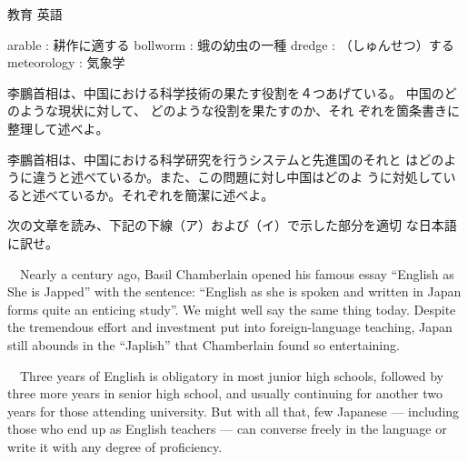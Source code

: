 \documentclass[fleqn]{jbook}
\begin{document}
\begin{question}{教育 英語}{}
\begin{subquestions}
  arable      : 耕作に適する \quad
  bollworm    : 蛾の幼虫の一種 \quad
  dredge      : （しゅんせつ）する \quad
  meteorology : 気象学
\baselineskip=15pt

  \noindent{[設問]}
  \begin{subsubquestions}
  \SubSubQuestion
    李鵬首相は、中国における科学技術の果たす役割を４つあげている。
  中国のどのような現状に対して、 どのような役割を果たすのか、それ
  ぞれを箇条書きに整理して述べよ。

  \SubSubQuestion
    李鵬首相は、中国における科学研究を行うシステムと先進国のそれと
  はどのように違うと述べているか。また、この問題に対し中国はどのよ
  うに対処していると述べているか。それぞれを簡潔に述べよ。

  \end{subsubquestions}

\SubQuestion
    次の文章を読み、下記の下線（ア）および（イ）で示した部分を適切
  な日本語に訳せ。

\baselineskip=12pt

  　Nearly a century ago, Basil Chamberlain opened his famous
  essay ``English as She is Japped'' with the sentence: ``English as
  she is spoken and written in Japan forms quite an enticing
  study''. We might well say the same thing today. Despite the
  tremendous effort and investment put into foreign-language
  teaching, Japan still abounds in the ``Japlish'' that Chamberlain
  found so entertaining.

  　Three years of English is obligatory in most junior high
  schools, followed by three more years in senior high school, and
  usually continuing for another two years for those attending
  university. But with all that, few Japanese --- including those who
  end up as English teachers --- can converse freely in the language or 
  write it with any degree of proficiency. 


\end{subquestions}
\end{question}
\end{document}
